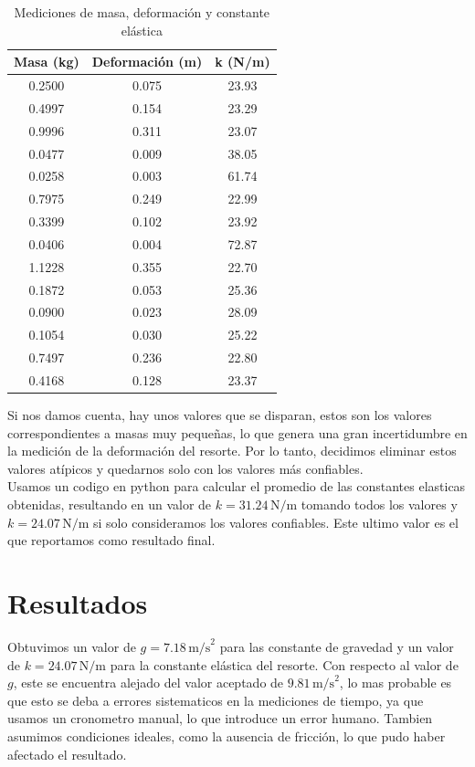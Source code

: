 \documentclass{article}
\begin{document}
\begin{table}[H]
\centering
\begin{tabular}{|c|c|c|}
\hline
Masa (kg) & Deformación (m) & k (N/m) \\
\hline
0.2500 & 0.075 & 23.93 \\
\hline
0.4997 & 0.154 & 23.29 \\
\hline
0.9996 & 0.311 & 23.07 \\
\hline
0.0477 & 0.009 & 38.05 \\
\hline
0.0258 & 0.003 & 61.74 \\
\hline
0.7975 & 0.249 & 22.99 \\
\hline
0.3399 & 0.102 & 23.92 \\
\hline
0.0406 & 0.004 & 72.87 \\
\hline
1.1228 & 0.355 & 22.70 \\
\hline
0.1872 & 0.053 & 25.36 \\
\hline
0.0900 & 0.023 & 28.09 \\
\hline
0.1054 & 0.030 & 25.22 \\
\hline
0.7497 & 0.236 & 22.80 \\
\hline
0.4168 & 0.128 & 23.37 \\
\hline
\end{tabular}
\caption{Mediciones de masa, deformación y constante elástica}
\label{tab:mediciones-resorte}
\end{table}

Si nos damos cuenta, hay unos valores que se disparan, estos son los
valores correspondientes a masas muy pequeñas, lo que genera una gran
incertidumbre en la medición de la deformación del resorte. Por lo tanto,
decidimos eliminar estos valores atípicos y quedarnos solo con los valores
más confiables. \\

Usamos un codigo en python para calcular el promedio de las constantes 
elasticas obtenidas, resultando en un valor de $k = 31.24 \, \text{N/m}$
tomando todos los valores y $k = 24.07 \, \text{N/m}$ si solo consideramos
los valores confiables. Este ultimo valor es el que reportamos como
resultado final. \\

\section*{Resultados}
Obtuvimos un valor de $g = 7.18 \, \text{m/s}^2$ para las constante de 
gravedad y un valor de $k = 24.07 \,
\text{N/m}$ para la constante elástica del resorte. Con respecto al valor de
$g$, este se encuentra alejado del valor aceptado de $9.81 \,\text{m/s}^2$,
lo mas probable es que esto se deba a errores sistematicos en la mediciones
de tiempo, ya que usamos un cronometro manual, lo que introduce un error
humano. Tambien asumimos condiciones ideales, como la ausencia de fricción, 
lo que pudo haber afectado el resultado. \\
\end{document}
